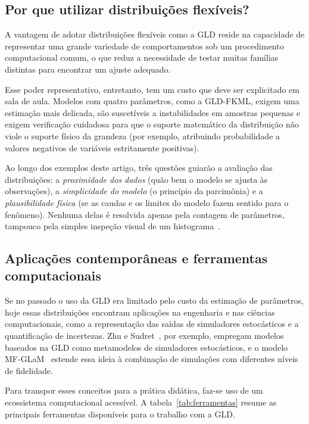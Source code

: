 \subsection{Por que utilizar distribuições flexíveis?}

A vantagem de adotar distribuições flexíveis como a GLD reside na capacidade de representar uma grande variedade de comportamentos sob um procedimento computacional comum, o que reduz a necessidade de testar muitas famílias distintas para encontrar um ajuste adequado.

Esse poder representativo, entretanto, tem um custo que deve ser explicitado em sala de aula. Modelos com quatro parâmetros, como a GLD-FKML, exigem uma estimação mais delicada, são suscetíveis a instabilidades em amostras pequenas e exigem verificação cuidadosa para que o suporte matemático da distribuição não viole o suporte físico da grandeza (por exemplo, atribuindo probabilidade a valores negativos de variáveis estritamente positivas).

Ao longo dos exemplos deste artigo, três questões guiarão a avaliação das distribuições: a \textit{proximidade dos dados} (quão bem o modelo se ajusta às observações), a \textit{simplicidade do modelo} (o princípio da parcimônia) e a \textit{plausibilidade física} (se as caudas e os limites do modelo fazem sentido para o fenômeno). Nenhuma delas é resolvida apenas pela contagem de parâmetros, tampouco pela simples inspeção visual de um histograma~\cite{nist2012}.

\subsection{Aplicações contemporâneas e ferramentas computacionais}

Se no passado o uso da GLD era limitado pelo custo da estimação de parâmetros, hoje essas distribuições encontram aplicações na engenharia e nas ciências computacionais, como a representação das saídas de simuladores estocásticos e a quantificação de incertezas. Zhu e Sudret~\cite{zhu2021}, por exemplo, empregam modelos baseados na GLD como metamodelos de simuladores estocásticos, e o modelo MF-GLaM~\cite{giannoukou2026} estende essa ideia à combinação de simulações com diferentes níveis de fidelidade.

Para transpor esses conceitos para a prática didática, faz-se uso de um ecossistema computacional acessível. A tabela~\ref{tab:ferramentas} resume as principais ferramentas disponíveis para o trabalho com a GLD.

